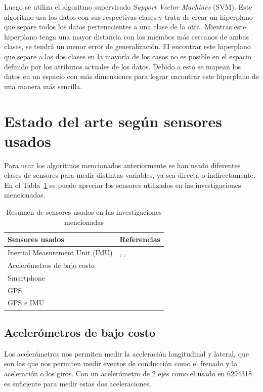 Luego se utiliza el algoritmo supervisado {\it Support Vector Machines} (SVM). Este algoritmo usa los datos con sus respectivas clases y trata de crear un hiperplano que separe todos los datos pertenecientes a una clase de la otra. Mientras este hiperplano tenga una mayor distancia con los miembos más cercanos de ambas clases, se tendrá un menor error de generalización. El encontrar este hiperplano que separe a las dos clases en la mayoría de los casos no es posible en el espacio definido por los atributos actuales de los datos. Debido a esto se mapean los datos en un espacio con más dimensiones para lograr encontrar este hiperplano de una manera más sencilla.

\section{Estado del arte según sensores usados}

Para usar los algoritmos mencionados anteriormente se han usado diferentes clases de sensores para medir distintas variables, ya sea directa o indirectamente. En el Tabla~\ref{diag:2.3} se puede apreciar los sensores utilizados en las investigaciones mencionadas.

\begin{table}[htpb!]
\centering
\caption{Resumen de sensores usados en las investigaciones mencionadas}
\begin{tabular}{@{}ll@{}}
\toprule
Sensores usados & Referencias \\ \midrule
Inertial Measurement Unit (IMU)& \cite{4938719}, \cite{7727682}, \cite{6629603} \\
Acelerómetros de bajo costo & \cite{6294318} \\
Smartphone & \cite{6083078} \\
GPS & \cite{constantinescu} \\
GPS e IMU & \cite{6957822} \\ \bottomrule
\end{tabular}
\label{diag:2.3}
\end{table}

\subsection{Acelerómetros de bajo costo}
Los acelerómetros nos permiten medir la aceleración longitudinal y lateral, que son las que nos permiten medir eventos de conducción como el frenado y la aceleración o los giros. Con un acelerómetro de 2 ejes como el usado en {6294318} es suficiente para medir estas dos aceleraciones.


